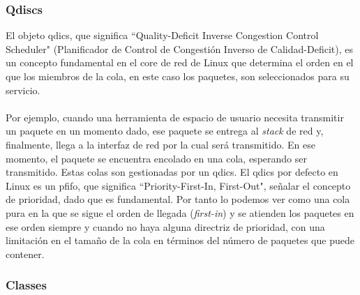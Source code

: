 \subsubsection{Qdiscs}

El objeto qdics, que significa ``Quality-Deficit Inverse Congestion Control Scheduler" (Planificador de Control de Congestión Inverso de Calidad-Deficit), es un concepto fundamental en el core de red de Linux que determina el orden en el que los miembros de la cola, en este caso los paquetes, son seleccionados para su servicio. \\
\\
Por ejemplo, cuando una herramienta de espacio de usuario necesita transmitir un paquete en un momento dado, ese paquete se entrega al \textit{stack} de red y, finalmente, llega a la interfaz de red por la cual será transmitido. En ese momento, el paquete se encuentra encolado en una cola, esperando ser transmitido. Estas colas son gestionadas por un qdics. El qdics por defecto en Linux es un pfifo, que significa ``Priority-First-In, First-Out", señalar el concepto de prioridad, dado que es fundamental. Por tanto lo podemos ver como una cola pura en la que se sigue el orden de llegada (\textit{first-in}) y se atienden los paquetes en ese orden siempre y cuando no haya alguna directriz de prioridad, con una limitación en el tamaño de la cola en términos del número de paquetes que puede contener.

\subsubsection{Classes}


